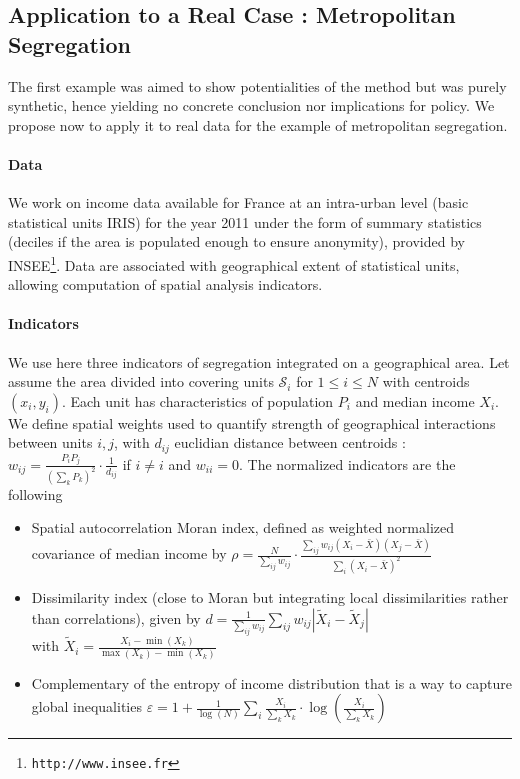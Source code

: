 \documentclass[runningheads,a4paper]{llncs2e/llncs}
\begin{document}
\subsection{Application to a Real Case : Metropolitan Segregation}

The first example was aimed to show potentialities of the method but was purely synthetic, hence yielding no concrete conclusion nor implications for policy. We propose now to apply it to real data for the example of metropolitan segregation.

\paragraph{Data}

We work on income data available for France at an intra-urban level (basic statistical units IRIS) for the year 2011 under the form of summary statistics (deciles if the area is populated enough to ensure anonymity), provided by INSEE\footnote{\texttt{http://www.insee.fr}}. Data are associated with geographical extent of statistical units, allowing computation of spatial analysis indicators. 

\paragraph{Indicators}

We use here three indicators of segregation integrated on a geographical area. Let assume the area divided into covering units $\mathcal{S}_i$ for $1\leq i \leq N$ with centroids $(x_i,y_i)$. Each unit has characteristics of population $P_i$ and median income $X_i$. We define spatial weights used to quantify strength of geographical interactions between units $i,j$, with $d_{ij}$ euclidian distance between centroids : $w_{ij} = \frac{P_i P_j}{\left(\sum_k P_k\right)^2}\cdot \frac{1}{d_{ij}}$ if $i\neq i$ and $w_{ii} = 0$. The normalized indicators are the following

\begin{itemize}
\item Spatial autocorrelation Moran index, defined as weighted normalized covariance of median income by $\rho = \frac{N}{\sum_{ij}w_{ij}}\cdot \frac{\sum_{ij}w_{ij}\left(X_i - \bar{X}\right)\left(X_j - \bar{X}\right)}{\sum_i \left(X_i - \bar{X}\right)^2}$
\item Dissimilarity index (close to Moran but integrating local dissimilarities rather than correlations), given by $d =  \frac{1}{\sum_{ij}w_{ij}} \sum_{ij} w_{ij} \left|\tilde{X}_i - \tilde{X}_j\right|$\\ with $\tilde{X}_i = \frac{X_i - \min(X_k)}{\max(X_k) - \min(X_k)}$
\item Complementary of the entropy of income distribution that is a way to capture global inequalities $\varepsilon = 1 + \frac{1}{\log(N)} \sum_i \frac{X_i}{\sum_k X_k} \cdot \log\left(\frac{X_i}{\sum_k X_k}\right)$
\end{itemize}
\end{document}
